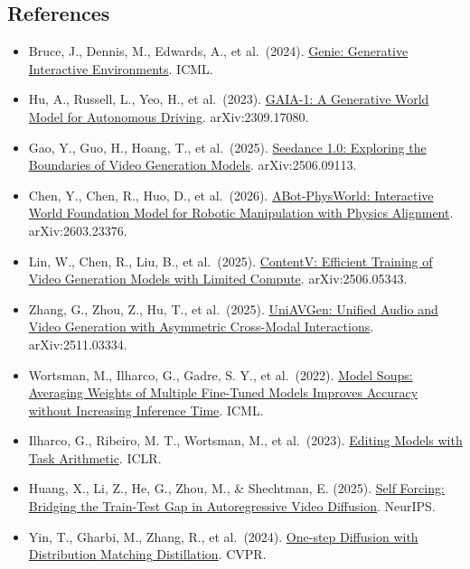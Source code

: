 \FloatBarrier
{}
\hypertarget{references-139}{%
\subsection{References}\label{references-139}}

\vspace{0.25em}
\begin{itemize}
\tightlist
\item
  Bruce, J., Dennis, M., Edwards, A., et al.~(2024). \href{https://arxiv.org/abs/2402.15391}{Genie: Generative Interactive Environments}. ICML.
\item
  Hu, A., Russell, L., Yeo, H., et al.~(2023). \href{https://arxiv.org/abs/2309.17080}{GAIA-1: A Generative World Model for Autonomous Driving}. arXiv:2309.17080.
\item
  Gao, Y., Guo, H., Hoang, T., et al.~(2025). \href{https://arxiv.org/abs/2506.09113}{Seedance 1.0: Exploring the Boundaries of Video Generation Models}. arXiv:2506.09113.
\item
  Chen, Y., Chen, R., Huo, D., et al.~(2026). \href{https://arxiv.org/abs/2603.23376}{ABot-PhysWorld: Interactive World Foundation Model for Robotic Manipulation with Physics Alignment}. arXiv:2603.23376.
\item
  Lin, W., Chen, R., Liu, B., et al.~(2025). \href{https://arxiv.org/abs/2506.05343}{ContentV: Efficient Training of Video Generation Models with Limited Compute}. arXiv:2506.05343.
\item
  Zhang, G., Zhou, Z., Hu, T., et al.~(2025). \href{https://arxiv.org/abs/2511.03334}{UniAVGen: Unified Audio and Video Generation with Asymmetric Cross-Modal Interactions}. arXiv:2511.03334.
\item
  Wortsman, M., Ilharco, G., Gadre, S. Y., et al.~(2022). \href{https://arxiv.org/abs/2203.05482}{Model Soups: Averaging Weights of Multiple Fine-Tuned Models Improves Accuracy without Increasing Inference Time}. ICML.
\item
  Ilharco, G., Ribeiro, M. T., Wortsman, M., et al.~(2023). \href{https://arxiv.org/abs/2212.04089}{Editing Models with Task Arithmetic}. ICLR.
\item
  Huang, X., Li, Z., He, G., Zhou, M., \& Shechtman, E. (2025). \href{https://arxiv.org/abs/2506.08009}{Self Forcing: Bridging the Train-Test Gap in Autoregressive Video Diffusion}. NeurIPS.
\item
  Yin, T., Gharbi, M., Zhang, R., et al.~(2024). \href{https://arxiv.org/abs/2311.18828}{One-step Diffusion with Distribution Matching Distillation}. CVPR.

\end{itemize}
